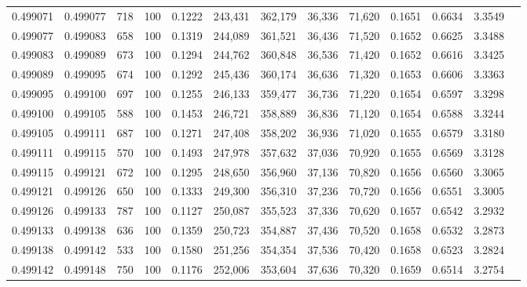 \begin{tabular}{rrrrrrrrrrrrr}
0.499071 & 0.499077 &   718 & 100 &                                     0.1222 & 243,431 & 362,179 &  36,336 &  71,620 & 0.1651 & 0.6634 & 3.3549 \\
0.499077 & 0.499083 &   658 & 100 &                                     0.1319 & 244,089 & 361,521 &  36,436 &  71,520 & 0.1652 & 0.6625 & 3.3488 \\
0.499083 & 0.499089 &   673 & 100 &                                     0.1294 & 244,762 & 360,848 &  36,536 &  71,420 & 0.1652 & 0.6616 & 3.3425 \\
0.499089 & 0.499095 &   674 & 100 &                                     0.1292 & 245,436 & 360,174 &  36,636 &  71,320 & 0.1653 & 0.6606 & 3.3363 \\
0.499095 & 0.499100 &   697 & 100 &                                     0.1255 & 246,133 & 359,477 &  36,736 &  71,220 & 0.1654 & 0.6597 & 3.3298 \\
0.499100 & 0.499105 &   588 & 100 &                                     0.1453 & 246,721 & 358,889 &  36,836 &  71,120 & 0.1654 & 0.6588 & 3.3244 \\
0.499105 & 0.499111 &   687 & 100 &                                     0.1271 & 247,408 & 358,202 &  36,936 &  71,020 & 0.1655 & 0.6579 & 3.3180 \\
0.499111 & 0.499115 &   570 & 100 &                                     0.1493 & 247,978 & 357,632 &  37,036 &  70,920 & 0.1655 & 0.6569 & 3.3128 \\
0.499115 & 0.499121 &   672 & 100 &                                     0.1295 & 248,650 & 356,960 &  37,136 &  70,820 & 0.1656 & 0.6560 & 3.3065 \\
0.499121 & 0.499126 &   650 & 100 &                                     0.1333 & 249,300 & 356,310 &  37,236 &  70,720 & 0.1656 & 0.6551 & 3.3005 \\
0.499126 & 0.499133 &   787 & 100 &                                     0.1127 & 250,087 & 355,523 &  37,336 &  70,620 & 0.1657 & 0.6542 & 3.2932 \\
0.499133 & 0.499138 &   636 & 100 &                                     0.1359 & 250,723 & 354,887 &  37,436 &  70,520 & 0.1658 & 0.6532 & 3.2873 \\
0.499138 & 0.499142 &   533 & 100 &                                     0.1580 & 251,256 & 354,354 &  37,536 &  70,420 & 0.1658 & 0.6523 & 3.2824 \\
0.499142 & 0.499148 &   750 & 100 &                                     0.1176 & 252,006 & 353,604 &  37,636 &  70,320 & 0.1659 & 0.6514 & 3.2754 \\

\end{tabular}
